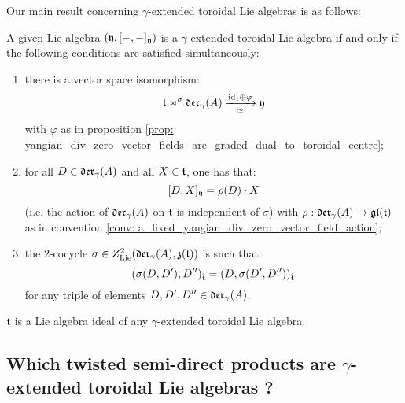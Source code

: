         Our main result concerning $\gamma$-extended toroidal Lie algebras is as follows:
        \begin{theorem} \label{theorem: yangian_extended_toroidal_lie_algebras_main_theorem}
            A given Lie algebra $(\mathfrak{y}, [-, -]_{\mathfrak{y}})$ is a $\gamma$-extended toroidal Lie algebra if and only if the following conditions are satisfied simultaneously:
            \begin{enumerate}
                \item there is a vector space isomorphism:
                    $$\mathfrak{t} \rtimes^{\sigma} \mathfrak{der}_{\gamma}(A) \xrightarrow[\simeq]{\mathrm{id}_{\mathfrak{t}} \oplus \varphi} \mathfrak{y}$$
                with $\varphi$ as in proposition \ref{prop: yangian_div_zero_vector_fields_are_graded_dual_to_toroidal_centre};
                \item for all $D \in \mathfrak{der}_{\gamma}(A)$ and all $X \in \mathfrak{t}$, one has that:
                    $$[D, X]_{\mathfrak{y}} = \rho(D) \cdot X$$
                (i.e. the action of $\mathfrak{der}_{\gamma}(A)$ on $\mathfrak{t}$ is independent of $\sigma$) with $\rho: \mathfrak{der}_{\gamma}(A) \to \mathfrak{gl}(\mathfrak{t})$ as in convention \ref{conv: a_fixed_yangian_div_zero_vector_field_action};

                \item the $2$-cocycle $\sigma \in Z^2_{\mathrm{Lie}}(\mathfrak{der}_{\gamma}(A), \mathfrak{z}(\mathfrak{t}))$ is such that:
                    $$(\sigma(D, D'), D'')_{\hat{\mathfrak{t}}} = (D, \sigma(D', D''))_{\hat{\mathfrak{t}}}$$
                for any triple of elements $D, D', D'' \in \mathfrak{der}_{\gamma}(A)$. 
            \end{enumerate}
        \end{theorem}
        \begin{corollary}
            $\mathfrak{t}$ is a Lie algebra ideal of any $\gamma$-extended toroidal Lie algebra.
        \end{corollary}

    \subsection{Which twisted semi-direct products are \texorpdfstring{$\gamma$}{}-extended toroidal Lie algebras ?}
    
